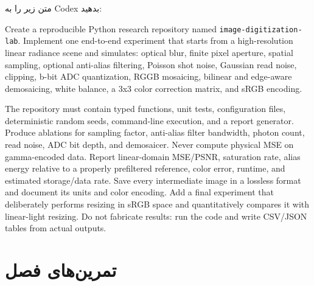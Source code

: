 \begin{workshopbox}
متن زیر را به Codex بدهید:

\begin{LTR}
\small
Create a reproducible Python research repository named
\texttt{image-digitization-lab}. Implement one end-to-end experiment that starts from a
high-resolution linear radiance scene and simulates: optical blur, finite pixel aperture,
spatial sampling, optional anti-alias filtering, Poisson shot noise, Gaussian read noise,
clipping, b-bit ADC quantization, RGGB mosaicing, bilinear and edge-aware demosaicing,
white balance, a 3x3 color correction matrix, and sRGB encoding.

The repository must contain typed functions, unit tests, configuration files, deterministic
random seeds, command-line execution, and a report generator. Produce ablations for sampling
factor, anti-alias filter bandwidth, photon count, read noise, ADC bit depth, and demosaicer.
Never compute physical MSE on gamma-encoded data. Report linear-domain MSE/PSNR, saturation
rate, alias energy relative to a properly prefiltered reference, color error, runtime, and
estimated storage/data rate. Save every intermediate image in a lossless format and document
its units and color encoding. Add a final experiment that deliberately performs resizing in
sRGB space and quantitatively compares it with linear-light resizing. Do not fabricate results:
run the code and write CSV/JSON tables from actual outputs.
\end{LTR}
\end{workshopbox}

\section{تمرین‌های فصل}

